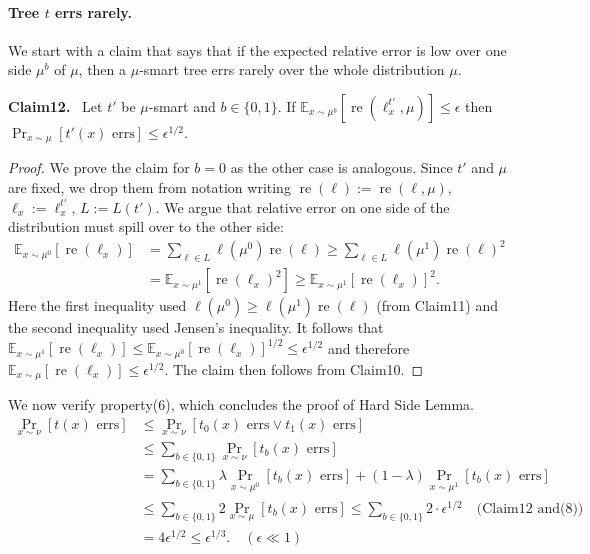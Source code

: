 \documentclass[10pt,a4paper]{article}
\newenvironment{authorclaim}[1]{\par\medskip\noindent\textbf{#1.}\ }{\par\medskip}
\begin{document}
\paragraph{Tree $t$ errs rarely.} We start with a claim that says that if the expected relative error is low over one side $\mu^b$ of $\mu$, then a $\mu$-smart tree errs rarely over the whole distribution $\mu$.
\begin{authorclaim}{Claim12}
Let $t'$ be $\mu$-smart and $b\in\{0,1\}$. If $\mathbb E_{x\sim\mu^b}[\operatorname{re}(\ell_x^{t'},\mu)]\le\epsilon$ then $\Pr_{x\sim\mu}[t'(x)\text{ errs}]\le\epsilon^{1/2}$.
\end{authorclaim}
\begin{proof}
We prove the claim for $b=0$ as the other case is analogous. Since $t'$ and $\mu$ are fixed, we drop them from notation writing $\operatorname{re}(\ell):=\operatorname{re}(\ell,\mu)$, $\ell_x:=\ell_x^{t'}$, $L:=L(t')$. We argue that relative error on one side of the distribution must spill over to the other side:
\begin{align*}
\mathbb E_{x\sim\mu^0}[\operatorname{re}(\ell_x)]&=\sum_{\ell\in L}\ell(\mu^0)\operatorname{re}(\ell)\ge\sum_{\ell\in L}\ell(\mu^1)\operatorname{re}(\ell)^2\\
&=\mathbb E_{x\sim\mu^1}[\operatorname{re}(\ell_x)^2]\ge\mathbb E_{x\sim\mu^1}[\operatorname{re}(\ell_x)]^2.
\end{align*}
Here the first inequality used $\ell(\mu^0)\ge\ell(\mu^1)\operatorname{re}(\ell)$ (from Claim11) and the second inequality used Jensen's inequality. It follows that $\mathbb E_{x\sim\mu^1}[\operatorname{re}(\ell_x)]\le\mathbb E_{x\sim\mu^0}[\operatorname{re}(\ell_x)]^{1/2}\le\epsilon^{1/2}$ and therefore $\mathbb E_{x\sim\mu}[\operatorname{re}(\ell_x)]\le\epsilon^{1/2}$. The claim then follows from Claim10.
\end{proof}
We now verify property(6), which concludes the proof of Hard Side Lemma.
\begin{align*}
\Pr_{x\sim\nu}[t(x)\text{ errs}]&\le\Pr_{x\sim\nu}[t_0(x)\text{ errs}\vee t_1(x)\text{ errs}]\\
&\le\sum_{b\in\{0,1\}}\Pr_{x\sim\nu}[t_b(x)\text{ errs}]\\
&=\sum_{b\in\{0,1\}}\lambda\Pr_{x\sim\mu^0}[t_b(x)\text{ errs}]+(1-\lambda)\Pr_{x\sim\mu^1}[t_b(x)\text{ errs}]\\
&\le\sum_{b\in\{0,1\}}2\Pr_{x\sim\mu}[t_b(x)\text{ errs}]\le\sum_{b\in\{0,1\}}2\cdot\epsilon^{1/2}\quad\text{(Claim12 and(8))}\\
&=4\epsilon^{1/2}\le\epsilon^{1/3}.\quad(\epsilon\ll1)
\end{align*}
\end{document}
